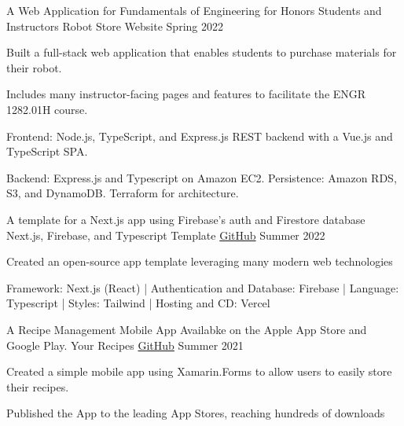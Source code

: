 
\begin{cventries}

  \cventry
    {A Web Application for Fundamentals of Engineering for Honors Students and Instructors} %
    {Robot Store Website} %
    {} %
    {Spring 2022} %
    {
      \begin{cvitems} %
        \item {Built a full-stack web application that enables students to purchase materials for their robot.}
        \item {Includes many instructor-facing pages and features to facilitate the ENGR 1282.01H course.}
        \item {Frontend: Node.js, TypeScript, and Express.js REST backend with a Vue.js and TypeScript SPA.}
        \item {Backend: Express.js and Typescript on Amazon EC2. Persistence: Amazon RDS, S3, and DynamoDB. Terraform for architecture.}
      \end{cvitems}
    }


    \cventry
    {A template for a Next.js app using Firebase's auth and Firestore database} %
    {Next.js, Firebase, and Typescript Template} %
    {\href{https://github.com/ahern55/next-firebase-typescript}{GitHub}} %
    {Summer 2022} %
    {
      \begin{cvitems} %
        \item {Created an open-source app template leveraging many modern web technologies}
        \item {Framework: Next.js (React) | Authentication and Database: Firebase | Language: Typescript | Styles: Tailwind | Hosting and CD: Vercel}
      \end{cvitems}
    }


  \cventry
    {A Recipe Management Mobile App Availabke on the Apple App Store and Google Play.} %
    {Your Recipes} %
    {\href{https://github.com/ahern55/recipes}{GitHub}} %
    {Summer 2021} %
    {
      \begin{cvitems} %
        \item {Created a simple mobile app using Xamarin.Forms to allow users to easily store their recipes.}
        \item {Published the App to the leading App Stores, reaching hundreds of downloads}
      \end{cvitems}
    }

\end{cventries}
